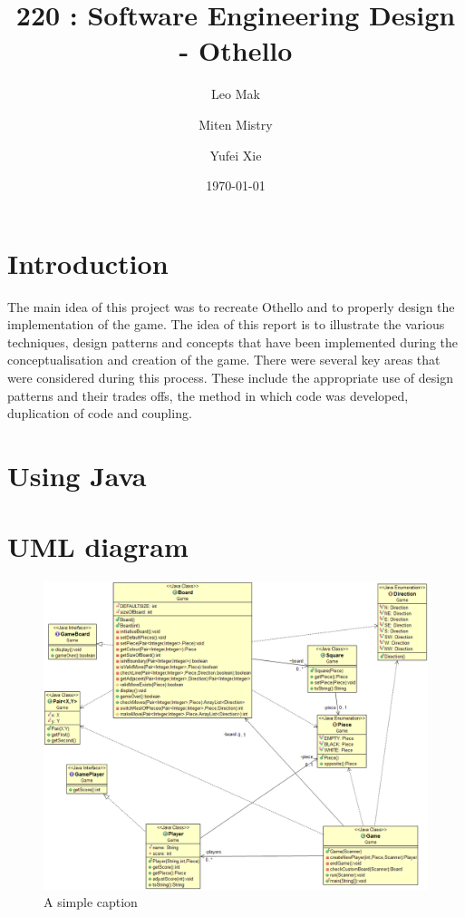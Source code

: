 \documentclass[a4wide, 11pt]{article}
\begin{document}
\title{220 : Software Engineering Design - Othello}

\author{Leo Mak \and Miten Mistry\and Yufei Xie}

\date{\today}         %

\maketitle            %

\section{Introduction}
The main idea of this project was to recreate Othello and to properly design the implementation of the game. The idea of this report is to illustrate the various techniques, design patterns and concepts that have been implemented during the conceptualisation and creation of the game. There were several key areas that were considered during this process. These include the appropriate use of design patterns and their trades offs, the method in which code was developed, duplication of code and coupling.

\section{Using Java}

\section{UML diagram}

\begin{figure}[ht!]
\centering
\includegraphics{umlDiagram.png}
\caption{A simple caption}
\label{overflow}
\end{figure}
\end{document}
